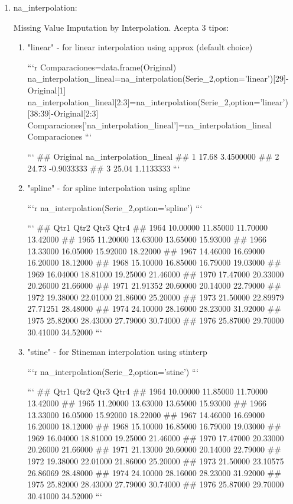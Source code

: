 \documentclass[
]{article}
\begin{document}
\begin{enumerate}
\item na\_interpolation:

Missing Value Imputation by Interpolation. Acepta 3 tipos:
\begin{enumerate}
\item "linear" - for linear interpolation using approx (default choice)


```r
Comparaciones=data.frame(Original)
na_interpolation_lineal=na_interpolation(Serie_2,option='linear')[29]-Original[1]
na_interpolation_lineal[2:3]=na_interpolation(Serie_2,option='linear')[38:39]-Original[2:3]
Comparaciones['na_interpolation_lineal']=na_interpolation_lineal
Comparaciones
```

```
##   Original na_interpolation_lineal
## 1    17.68               3.4500000
## 2    24.73              -0.9033333
## 3    25.04               1.1133333
```

\item "spline" - for spline interpolation using spline

```r
na_interpolation(Serie_2,option='spline')
```

```
##          Qtr1     Qtr2     Qtr3     Qtr4
## 1964 10.00000 11.85000 11.70000 13.42000
## 1965 11.20000 13.63000 13.65000 15.93000
## 1966 13.33000 16.05000 15.92000 18.22000
## 1967 14.46000 16.69000 16.20000 18.12000
## 1968 15.10000 16.85000 16.79000 19.03000
## 1969 16.04000 18.81000 19.25000 21.46000
## 1970 17.47000 20.33000 20.26000 21.66000
## 1971 21.91352 20.60000 20.14000 22.79000
## 1972 19.38000 22.01000 21.86000 25.20000
## 1973 21.50000 22.89979 27.71251 28.48000
## 1974 24.10000 28.16000 28.23000 31.92000
## 1975 25.82000 28.43000 27.79000 30.74000
## 1976 25.87000 29.70000 30.41000 34.52000
```

\item "stine" - for Stineman interpolation using stinterp

```r
na_interpolation(Serie_2,option='stine')
```

```
##          Qtr1     Qtr2     Qtr3     Qtr4
## 1964 10.00000 11.85000 11.70000 13.42000
## 1965 11.20000 13.63000 13.65000 15.93000
## 1966 13.33000 16.05000 15.92000 18.22000
## 1967 14.46000 16.69000 16.20000 18.12000
## 1968 15.10000 16.85000 16.79000 19.03000
## 1969 16.04000 18.81000 19.25000 21.46000
## 1970 17.47000 20.33000 20.26000 21.66000
## 1971 21.13000 20.60000 20.14000 22.79000
## 1972 19.38000 22.01000 21.86000 25.20000
## 1973 21.50000 23.10575 26.86069 28.48000
## 1974 24.10000 28.16000 28.23000 31.92000
## 1975 25.82000 28.43000 27.79000 30.74000
## 1976 25.87000 29.70000 30.41000 34.52000
```


\end{enumerate}
\end{enumerate}
\end{document}
